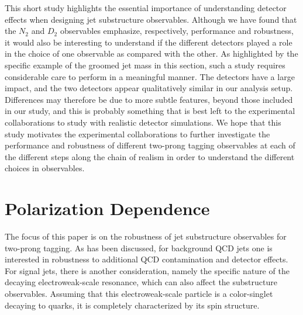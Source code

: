 \documentclass[11pt,letterpaper]{article}
\begin{document}
This short study highlights the essential importance of understanding detector effects when designing jet substructure observables.
%
Although we have found that the $N_2$ and $D_2$ observables emphasize, respectively, performance and robustness, it would also be interesting to understand if the different detectors played a role in the choice of one observable as compared with the other.
%
As highlighted by the specific example of the groomed jet mass in this section, such a study requires considerable care to perform in a meaningful manner.
%
The detectors have a large impact, and the two detectors appear qualitatively similar in our analysis setup.
%
Differences may therefore be due to more subtle features, beyond those included in our study, and this is probably something that is best left to the experimental collaborations to study with realistic detector simulations.
%
We hope that this study motivates the experimental collaborations to further investigate the performance and robustness of different two-prong tagging observables at each of the different steps along the chain of realism in order to understand the different choices in observables.



\section{Polarization Dependence}\label{jetsub_2prong_sec:polar}

The focus of this paper is on the robustness of jet substructure
observables for two-prong tagging.
%
As has been discussed, for
background QCD jets one is interested in robustness to additional QCD
contamination and detector effects.
%
For signal jets, there is another consideration, namely the specific nature of the decaying electroweak-scale resonance, which can also affect the substructure observables.
%
Assuming that this electroweak-scale particle is a color-singlet decaying to quarks, it is completely
characterized by its spin structure.
\end{document}
